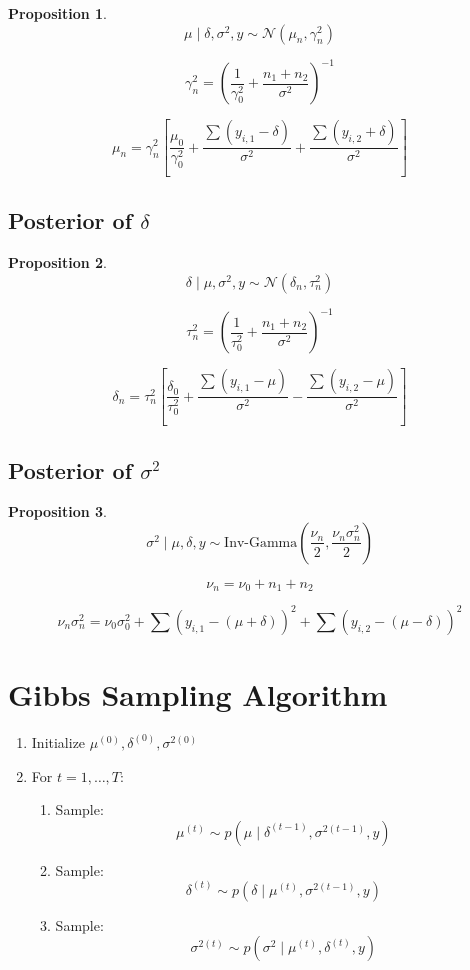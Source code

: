 \documentclass[12pt,oneside]{book}
\numberwithin{equation}{section}
\theoremstyle{definition}
\theoremstyle{plain}
\newtheorem{proposition}{Proposition}[section]
\theoremstyle{remark}
\newcommand{\Normal}{\mathcal{N}}
\begin{document}
\begin{proposition}
$$
\mu \mid \delta, \sigma^2, y
\sim
\Normal(\mu_n, \gamma_n^2)
$$

$$
\gamma_n^2 =
\left(
\frac{1}{\gamma_0^2} + \frac{n_1 + n_2}{\sigma^2}
\right)^{-1}
$$

$$
\mu_n =
\gamma_n^2
\left[
\frac{\mu_0}{\gamma_0^2}
+
\frac{\sum (y_{i,1} - \delta)}{\sigma^2}
+
\frac{\sum (y_{i,2} + \delta)}{\sigma^2}
\right]
$$
\end{proposition}

\subsection{Posterior of $\delta$}

\begin{proposition}
$$
\delta \mid \mu, \sigma^2, y
\sim
\Normal(\delta_n, \tau_n^2)
$$

$$
\tau_n^2 =
\left(
\frac{1}{\tau_0^2} + \frac{n_1 + n_2}{\sigma^2}
\right)^{-1}
$$

$$
\delta_n =
\tau_n^2
\left[
\frac{\delta_0}{\tau_0^2}
+
\frac{\sum (y_{i,1} - \mu)}{\sigma^2}
-
\frac{\sum (y_{i,2} - \mu)}{\sigma^2}
\right]
$$
\end{proposition}

\subsection{Posterior of $\sigma^2$}

\begin{proposition}
$$
\sigma^2 \mid \mu, \delta, y
\sim
\text{Inv-Gamma}\left(\frac{\nu_n}{2}, \frac{\nu_n \sigma_n^2}{2}\right)
$$

$$
\nu_n = \nu_0 + n_1 + n_2
$$

$$
\nu_n \sigma_n^2 =
\nu_0 \sigma_0^2
+
\sum (y_{i,1} - (\mu + \delta))^2
+
\sum (y_{i,2} - (\mu - \delta))^2
$$
\end{proposition}

\section{Gibbs Sampling Algorithm}

\begin{algorithm}
\begin{enumerate}
\item Initialize $\mu^{(0)}, \delta^{(0)}, \sigma^{2(0)}$
\item For $t = 1, \dots, T$:
\begin{enumerate}
\item Sample:
$$
\mu^{(t)} \sim p(\mu \mid \delta^{(t-1)}, \sigma^{2(t-1)}, y)
$$
\item Sample:
$$
\delta^{(t)} \sim p(\delta \mid \mu^{(t)}, \sigma^{2(t-1)}, y)
$$
\item Sample:
$$
\sigma^{2(t)} \sim p(\sigma^2 \mid \mu^{(t)}, \delta^{(t)}, y)
$$
\end{enumerate}
\end{enumerate}
\end{algorithm}
\end{document}
